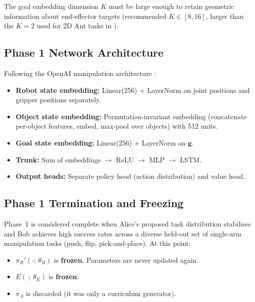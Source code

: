 \documentclass[12pt, a4paper]{article}
\newcommand{\piA}{\pi_A}
\newcommand{\piB}{\pi_B}
\newcommand{\Enc}{E}
\newcommand{\goalvec}{\mathbf{g}}
\begin{document}
The goal embedding dimension $K$ must be large enough to retain geometric information about
end-effector targets (recommended $K \in [8, 16]$, larger than the $K=2$ used for 2D Ant
tasks in \citet{sukhbaatar2018learning}).

\subsection{Phase 1 Network Architecture}
\label{subsec:network_phase1}

Following the OpenAI manipulation architecture \cite{plappert2021asymmetric}:

\begin{itemize}
    \item \textbf{Robot state embedding:} Linear(256) + LayerNorm on joint positions and
          gripper positions separately.
    \item \textbf{Object state embedding:} Permutation-invariant embedding (concatenate per-object
          features, embed, max-pool over objects) with 512 units.
    \item \textbf{Goal state embedding:} Linear(256) + LayerNorm on $\goalvec$.
    \item \textbf{Trunk:} Sum of embeddings $\to$ ReLU $\to$ MLP $\to$ LSTM.
    \item \textbf{Output heads:} Separate policy head (action distribution) and value head.
\end{itemize}

\subsection{Phase 1 Termination and Freezing}
\label{subsec:phase1_stop}

Phase~1 is considered complete when Alice's proposed task distribution stabilises and Bob
achieves high success rates across a diverse held-out set of single-arm manipulation tasks
(push, flip, pick-and-place). At this point:

\begin{itemize}[nosep]
    \item $\piB'(\cdot;\, \theta_B)$ is \textbf{frozen}. Parameters are never updated again.
    \item $\Enc(\cdot;\, \theta_E)$ is \textbf{frozen}.
    \item $\piA$ is discarded (it was only a curriculum generator).
\end{itemize}

\end{document}
